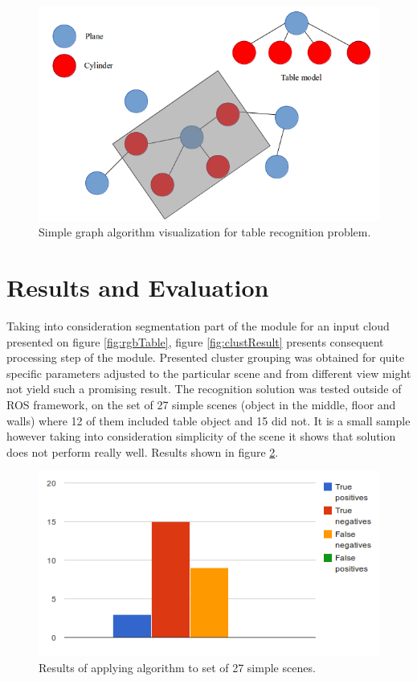 \documentclass[fontsize=12pt]{article}
\begin{document}
\begin{figure}
\begin{center}
  \includegraphics[scale=0.5]{images/graph}
  \caption{Simple graph algorithm visualization for table recognition problem.}
  \label{graphAlg}
  \end{center}
\end{figure}

\section{Results and Evaluation}
Taking into consideration segmentation part of the module for an input cloud presented on figure \ref{fig:rgbTable}, figure \ref{fig:clustResult} presents consequent processing step of the module. Presented cluster grouping was obtained for quite specific parameters adjusted to the particular scene and from different view might not yield such a promising result.
The recognition solution was tested outside of ROS framework, on the set of 27 simple scenes (object in the middle, floor and walls) where 12 of them included table object and 15 did not. It is a small sample however taking into consideration simplicity of the scene it shows that solution does not perform really well. Results shown in figure \ref{fig:resultChart}.

\begin{figure}
\begin{center}
  \includegraphics[scale=0.7]{images/resultChart}
  \caption{Results of applying algorithm to set of 27 simple scenes.}
  \label{fig:resultChart}
  \end{center}
\end{figure}
\end{document}
